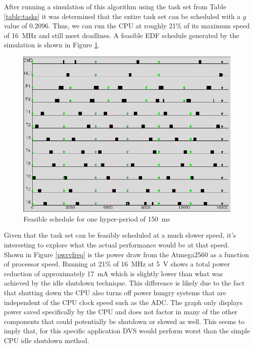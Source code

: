 \documentclass{article}
\begin{document}
After running a simulation of this algorithm using the task set from Table \ref{table:tasks} it was determined that the entire task set can be scheduled with a $g$ value of 0.2096. Thus, we can run the CPU at roughly 21\% of its maximum speed of \SI{16}{\mega\hertz} and still meet deadlines. A feasible EDF schedule generated by the simulation is shown in Figure \ref{fig:schedule}. 
\begin{figure}[H]
\centering
        \includegraphics[scale=.4]{feasible_schedule.png}
    \caption{Feasible schedule for one hyper-period of \SI{150}{\milli\second} }
    \label{fig:schedule}
\end{figure}

Given that the task set can be feasibly scheduled at a much slower speed, it's interesting to explore what the actual performance would be at that speed. Shown in Figure \ref{pwrvfreq} is the power draw from the Atmega2560 as a function of processor speed. Running at 21\% of \SI{16}{\mega\hertz} at \SI{5}{\volt} shows a total power reduction of approximately \SI{17}{\milli\ampere} which is slightly lower than what was achieved by the idle shutdown technique. This difference is likely due to the fact that shutting down the CPU also turns off power hungry systems that are independent of the CPU clock speed such as the ADC. The graph only displays power saved specifically by the CPU and does not factor in many of the other components that could potentially be shutdown or slowed as well. This seems to imply that, for this specific application DVS would perform worst than the simple CPU idle shutdown method.
 
\end{document}

